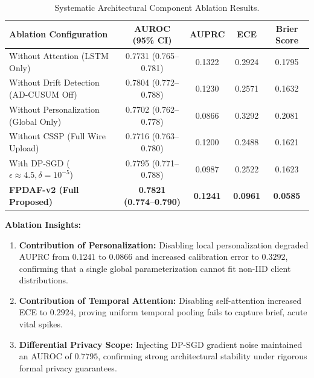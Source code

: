 \documentclass[11pt, a4paper]{article}
\begin{document}
\begin{table}[H]
\centering
\small
\renewcommand{\arraystretch}{1.2}
\begin{tabular}{lcccc}
\toprule
\textbf{Ablation Configuration} & \textbf{AUROC (95\% CI)} & \textbf{AUPRC} & \textbf{ECE} & \textbf{Brier Score} \\
\midrule
Without Attention (LSTM Only) & 0.7731 (0.765--0.781) & 0.1322 & 0.2924 & 0.1795 \\
Without Drift Detection (AD-CUSUM Off) & 0.7804 (0.772--0.788) & 0.1230 & 0.2571 & 0.1632 \\
Without Personalization (Global Only) & 0.7702 (0.762--0.778) & 0.0866 & 0.3292 & 0.2081 \\
Without CSSP (Full Wire Upload) & 0.7716 (0.763--0.780) & 0.1200 & 0.2488 & 0.1621 \\
With DP-SGD ($\epsilon \approx 4.5, \delta=10^{-5}$) & 0.7795 (0.771--0.788) & 0.0987 & 0.2522 & 0.1623 \\
\midrule
\textbf{FPDAF-v2 (Full Proposed)} & \textbf{0.7821 (0.774--0.790)} & \textbf{0.1241} & \textbf{0.0961} & \textbf{0.0585} \\
\bottomrule
\end{tabular}
\caption{Systematic Architectural Component Ablation Results.}
\label{tab:ablation}
\end{table}

\noindent
\textbf{Ablation Insights:}
\begin{enumerate}
    \item \textbf{Contribution of Personalization:} Disabling local personalization degraded AUPRC from $0.1241$ to $0.0866$ and increased calibration error to $0.3292$, confirming that a single global parameterization cannot fit non-IID client distributions.
    \item \textbf{Contribution of Temporal Attention:} Disabling self-attention increased ECE to $0.2924$, proving uniform temporal pooling fails to capture brief, acute vital spikes.
    \item \textbf{Differential Privacy Scope:} Injecting DP-SGD gradient noise maintained an AUROC of $0.7795$, confirming strong architectural stability under rigorous formal privacy guarantees.
\end{enumerate}

\end{document}
